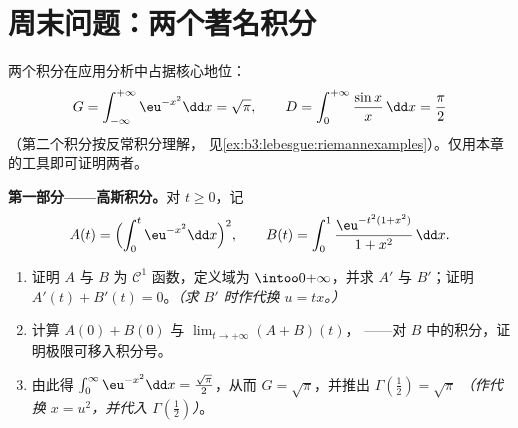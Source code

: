\section{周末问题：两个著名积分}

\begin{problem}
\label{pb:b3:lebesgue:1}
两个积分在应用分析中占据核心地位：
\[
G = \int_{-\infty}^{+\infty}\eu^{-x^2}\dd x = \sqrt\pi,
\qquad
D = \int_0^{+\infty}\frac{\sin x}{x}\,\dd x = \frac\pi2
\]
（第二个积分按反常积分理解，
见\cref{ex:b3:lebesgue:riemannexamples}）。仅用本章
的工具即可证明两者。

\medskip
\noindent\textbf{第一部分——高斯积分。}对 $t \geq 0$，记
\[
A(t) = \Bigl(\int_0^t\eu^{-x^2}\dd x\Bigr)^{2},
\qquad
B(t) = \int_0^1\frac{\eu^{-t^2(1 + x^2)}}{1 + x^2}\,\dd x .
\]
\begin{enumerate}
  \item 证明 $A$ 与 $B$ 为 $\mathcal C^1$ 函数，定义域为
        $\intoo0{+\infty}$，并求 $A'$ 与 $B'$；证明
        $A'(t) + B'(t) = 0$。\emph{（求 $B'$ 时作代换 $u =
        tx$。）}
  \item 计算 $A(0) + B(0)$ 与 $\lim_{t\to+\infty}(A + B)(t)$，
        ——对 $B$ 中的积分，证明极限可移入积分号。
  \item 由此得 $\int_0^\infty \eu^{-x^2}\dd x =
        \frac{\sqrt\pi}2$，从而 $G = \sqrt\pi$，并推出
        $\Gamma(\tfrac12) = \sqrt\pi$ \emph{（作代换 $x =
        u^2$，并代入 $\Gamma(\frac12)$）}。
\end{enumerate}


\end{problem}
